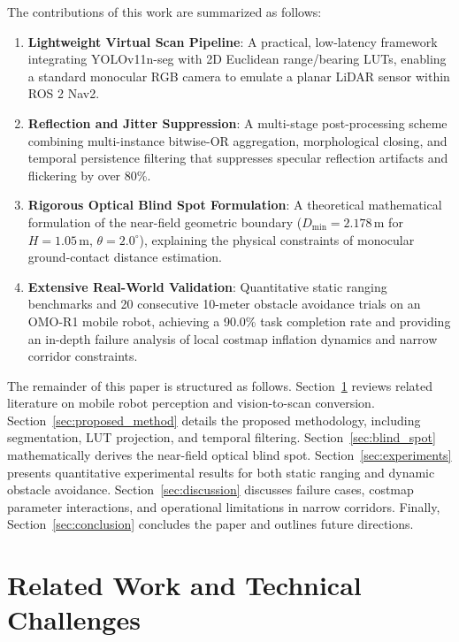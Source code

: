 \documentclass[preprint,12pt]{elsarticle}
\begin{document}
The contributions of this work are summarized as follows:
\begin{enumerate}
  \item \textbf{Lightweight Virtual Scan Pipeline}: A practical, low-latency framework integrating YOLOv11n\allowbreak-seg with 2D Euclidean range/\allowbreak bearing LUTs, enabling a standard monocular RGB camera to emulate a planar LiDAR sensor within ROS 2 Nav2.
  \item \textbf{Reflection and Jitter Suppression}: A multi-stage post-processing scheme combining multi-instance bitwise-OR aggregation, morphological closing, and temporal persistence filtering that suppresses specular reflection artifacts and flickering by over 80\%.
  \item \textbf{Rigorous Optical Blind Spot Formulation}: A theoretical mathematical formulation of the near-field geometric boundary ($D_{\min} = 2.178$\,m for $H = 1.05$\,m, $\theta = 2.0^\circ$), explaining the physical constraints of monocular ground-contact distance estimation.
  \item \textbf{Extensive Real-World Validation}: Quantitative static ranging benchmarks and 20 consecutive 10-meter obstacle avoidance trials on an OMO-R1 mobile robot, achieving a 90.0\% task completion rate and providing an in-depth failure analysis of local costmap inflation dynamics and narrow corridor constraints.
\end{enumerate}

The remainder of this paper is structured as follows. Section~\ref{sec:related_work} reviews related literature on mobile robot perception and vision-to-scan conversion. Section~\ref{sec:proposed_method} details the proposed methodology, including segmentation, LUT projection, and temporal filtering. Section~\ref{sec:blind_spot} mathematically derives the near-field optical blind spot. Section~\ref{sec:experiments} presents quantitative experimental results for both static ranging and dynamic obstacle avoidance. Section~\ref{sec:discussion} discusses failure cases, costmap parameter interactions, and operational limitations in narrow corridors. Finally, Section~\ref{sec:conclusion} concludes the paper and outlines future directions.

\section{Related Work and Technical Challenges}
\label{sec:related_work}
\end{document}
